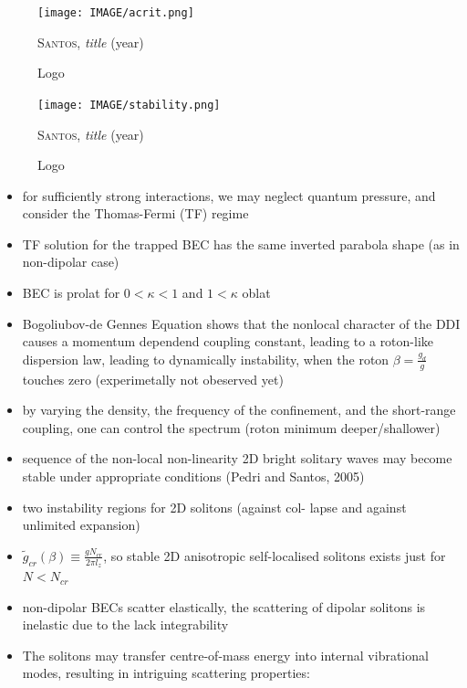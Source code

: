 \begin{figure}[H]
    \centering
    \texttt{[image: IMAGE/acrit.png]}\\
    \caption{Logo}
    \textsc{Santos}, \emph{title} (year)
    \label{fig:acrit}
\end{figure}

\begin{figure}[H]
    \centering
    \texttt{[image: IMAGE/stability.png]}\\
    \caption{Logo}
    \textsc{Santos}, \emph{title} (year)
    \label{fig:stability}
\end{figure}

\begin{itemize}
        \item for sufficiently strong interactions, we may neglect quantum pressure, and consider the Thomas-Fermi (TF) regime
        \item TF solution for the trapped BEC has the same inverted parabola shape (as in non-dipolar case)
        \item BEC is prolat for $0 < \kappa < 1$ and $1 < \kappa$ oblat
        \item Bogoliubov-de Gennes Equation shows that the nonlocal character of the DDI causes a momentum dependend coupling constant, leading to a roton-like dispersion law, leading to dynamically instability, when the roton $\beta = \frac{g_{d}}{g}$ touches zero (experimetally not obeserved yet)
        \item by varying the density, the frequency of the confinement, and the short-range coupling,
        one can control the spectrum (roton minimum deeper/shallower)
        \item sequence of the non-local non-linearity 2D bright solitary waves may become stable
under appropriate conditions (Pedri and Santos, 2005)
        \item two instability regions for 2D solitons (against col-
        lapse and against unlimited expansion)
  \item $\tilde{g}_{cr}(\beta) \equiv \frac{g N_{cr}}{2 \pi l_{z}}$, so stable 2D anisotropic self-localised solitons exists just for $N < N_{cr}$
        \item non-dipolar BECs scatter elastically, the scattering of dipolar solitons is inelastic due to the lack integrability
        \item The solitons may transfer centre-of-mass energy into internal vibrational modes,
        resulting in intriguing scattering properties:


\end{itemize}
